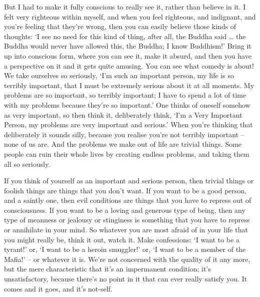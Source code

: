But I had to make it fully conscious to really see it, rather than believe in it. I felt very righteous within myself, and when you feel righteous, and indignant, and you're feeling that they're wrong, then you can easily believe those kinds of thoughts: `I see no need for this kind of thing, after all, the Buddha said \ldots{} the Buddha would never have allowed this, the Buddha; I know Buddhism!' Bring it up into conscious form, where you can see it, make it absurd, and then you have a perspective on it and it gets quite amusing. You can see what comedy is about! We take ourselves so seriously, `I'm such an important person, my life is so terribly important, that I must be extremely serious about it at all moments. My problems are so important, so terribly important; I have to spend a lot of time with my problems because they're so important.' One thinks of oneself somehow as very important, so then think it, deliberately think, `I'm a Very Important Person, my problems are very important and serious.' When you're thinking that deliberately it sounds silly, because you realise you're not terribly important -- none of us are. And the problems we make out of life are trivial things. Some people can ruin their whole lives by creating endless problems, and taking them all so seriously.

If you think of yourself as an important and serious person, then trivial things or foolish things are things that you don't want. If you want to be a good person, and a saintly one, then evil conditions are things that you have to repress out of consciousness. If you want to be a loving and generous type of being, then any type of meanness or jealousy or stinginess is something that you have to repress or annihilate in your mind. So whatever you are most afraid of in your life that you might really be, think it out, watch it. Make confessions: `I want to be a tyrant!' or, `I want to be a heroin smuggler!' or, `I want to be a member of the Mafia!' -- or whatever it is. We're not concerned with the quality of it any more, but the mere characteristic that it's an impermanent condition; it's unsatisfactory, because there's no point in it that can ever really satisfy you. It comes and it goes, and it's not-self.


